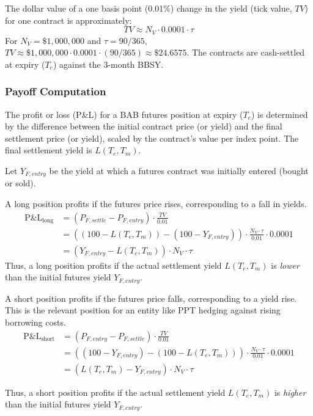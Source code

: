 \documentclass[11pt, a4paper, british]{article}
\begin{document}
The dollar value of a one basis point (0.01\%) change in the yield (tick value, $TV$) for one contract is approximately:
\begin{equation}
 TV \approx N_V \cdot 0.0001 \cdot \tau
\end{equation}
For $N_V = \$1,000,000$ and $\tau = 90/365$, $TV \approx \$1,000,000 \cdot 0.0001 \cdot (90/365) \approx \$24.6575$.
The contracts are cash-settled at expiry ($T_e$) against the 3-month BBSY.

\subsubsection{Payoff Computation}
The profit or loss (P\&L) for a BAB futures position at expiry ($T_e$) is determined by the difference between the initial contract price (or yield) and the final settlement price (or yield), scaled by the contract's value per index point. The final settlement yield is $L(T_e, T_m)$.

Let $Y_{F, entry}$ be the yield at which a futures contract was initially entered (bought or sold).

A long position profits if the futures price rises, corresponding to a fall in yields.
\begin{align}
 \text{P\&L}_{\text{long}} &= (P_{F,settle} - P_{F,entry}) \cdot \frac{TV}{0.01} \\
 &= ((100 - L(T_e, T_m)) - (100 - Y_{F,entry})) \cdot \frac{N_V \cdot \tau}{0.01} \cdot 0.0001 \nonumber \\
 &= (Y_{F,entry} - L(T_e, T_m)) \cdot N_V \cdot \tau \label{eq:long_futures_pnl}
\end{align}
Thus, a long position profits if the actual settlement yield $L(T_e, T_m)$ is \textit{lower} than the initial futures yield $Y_{F, entry}$.

A short position profits if the futures price falls, corresponding to a yield rise. This is the relevant position for an entity like PPT hedging against rising borrowing costs.
\begin{align}
 \text{P\&L}_{\text{short}} &= (P_{F,entry} - P_{F,settle}) \cdot \frac{TV}{0.01} \\
 &= ((100 - Y_{F,entry}) - (100 - L(T_e, T_m))) \cdot \frac{N_V \cdot \tau}{0.01} \cdot 0.0001 \nonumber \\
 &= (L(T_e, T_m) - Y_{F,entry}) \cdot N_V \cdot \tau \label{eq:short_futures_pnl}
\end{align}

Thus, a short position profits if the actual settlement yield $L(T_e, T_m)$ is \textit{higher} than the initial futures yield $Y_{F, entry}$.
\end{document}
